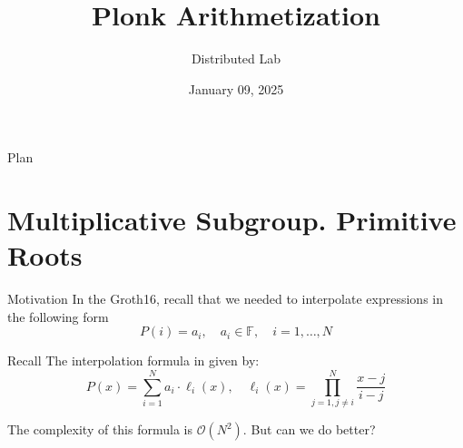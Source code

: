 \documentclass{zkdl-presentation-template}
\title[Plonk Arithmetization]{\textbf{Plonk Arithmetization}}
\author{Distributed Lab}
\date{January 09, 2025}
\begin{document}

    \begin{frame}{Plan}
        \tableofcontents
    \end{frame}

    \section{Multiplicative Subgroup. Primitive Roots}

    \begin{frame}{Motivation}
        In the Groth16, recall that we needed to interpolate expressions in the
        following form
        \begin{equation*}
            P(i) = a_i, \quad a_i \in \mathbb{F}, \quad i = 1,\dots,N
        \end{equation*}

        \begin{block}{Recall}
            The interpolation formula in given by:
            \begin{equation*}
                P(x) = \sum_{i=1}^{N} a_i \cdot \ell_i(x), \quad \ell_i(x) = \prod_{j=1, j \neq i}^{N} \frac{x - j}{i - j}
            \end{equation*}

            The complexity of this formula is $\mathcal{O}(N^2)$. But can we do better?
        \end{block}
    \end{frame}
\end{document}
